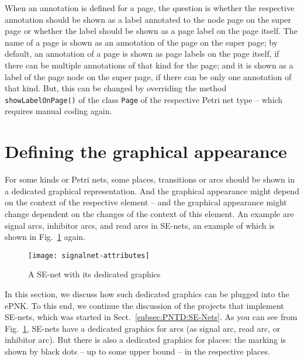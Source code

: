 When an annotation is defined for a page, the question is whether the
respective annotation should be shown as a label annotated to the
node page on the super page or whether the label should be shown
as a page label on the page itself. The name of a page is
shown as an annotation of the page on the super page; by default, an
annotation of a page is shown as page labels on the page itself,
if there can be multiple annotations of that kind for the page;
and it is shown as a label of the page node on the super page,
if there can be only one annotation of that kind. But, this can
be changed by overriding the method {\tt showLabelOnPage()}%
of the class {\tt Page} of the respective Petri net type -- which requires
manual coding again.%


\section{Defining the graphical appearance}
\label{sec:dev:graphical}

For some kinds or Petri nets, some places, transitions or arcs should be
shown in a dedicated graphical representation. And the graphical appearance
might depend on the context of the respective element -- and the graphical
appearance might change dependent on the changes of the context of this element.
An example are signal arcs, inhibitor arcs, and read arcs in SE-nets, an
example of which is shown in Fig.~\ref{fig:dev:signal-net-graphics} again.

\begin{figure}[hbt!!]
  \centerline{\texttt{[image: signalnet-attributes]}}
  \caption{A SE-net with its dedicated graphics}
  \label{fig:dev:signal-net-graphics}
\end{figure}

In this section, we discuss how such dedicated graphics can be plugged
into the ePNK. To this end, we continue the discussion of the projects that
implement SE-nets, which was started in Sect.~\ref{subsec:PNTD:SE-Nets}. 
As you can see from Fig.~\ref{fig:dev:signal-net-graphics}, SE-nets have a
dedicated graphics for arcs (as signal arc, read arc, or inhibitor arc).
But there is also a dedicated graphics for places: the marking is shown
by black dots -- up to some upper bound -- in the respective places.

